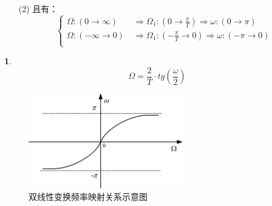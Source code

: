 \documentclass[notheorems,compress,mathserif,table]{beamer}
\newtheorem{dablock}{}
\begin{document}
\begin{frame}[allowframebreaks]
\begin{enumerate}
\begin{enumerate}
            \item [(2)] 且有：
          $$
          \left\{\begin{aligned}
            \Omega:(0\rightarrow\infty)\quad &\Rightarrow \Omega_1:(0\rightarrow\frac{\pi}{T})  \Rightarrow \omega:(0\rightarrow\pi)\\
            \Omega:(-\infty\rightarrow 0)    &\Rightarrow \Omega_1:(-\frac{\pi}{T}\rightarrow 0)\Rightarrow \omega:(-\pi \rightarrow 0)\\
          \end{aligned} \right.
          $$
          \end{enumerate}
          \newpage

          \begin{dablock}
          $$\Omega = \frac{2}{T} \cdot tg(\frac{\omega}{2})$$
          \end{dablock}
          \begin{figure}[h]
               \centering
               \includegraphics[width=0.6\textwidth]{fig20_BLT_pinlvguanxi.jpg}
               \caption{双线性变换频率映射关系示意图}
          \end{figure}

    \end{enumerate}

\end{frame}
\end{document}
